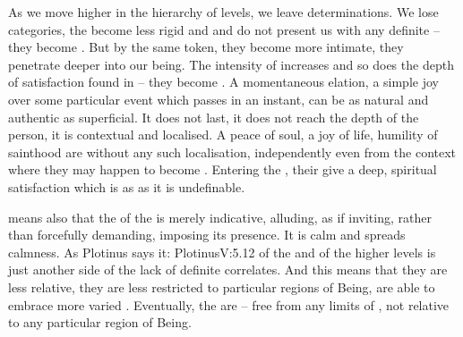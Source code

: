 \pa\label{pa:SchelerA} As we move higher in the hierarchy of levels, we leave
 determinations.  We lose  categories, the
 become less rigid and  and do not present us with
any definite  -- they become .  But by the same token,
they become more intimate, they penetrate deeper into our being.  The intensity
of  increases and so does the depth of satisfaction found in
 -- they become .  A momentaneous elation, a simple joy over some particular
event which passes in an instant, can be as natural and authentic as superficial.
It does not last, it does not reach the depth of the person, it is contextual and
localised.  A peace of soul, a joy of life, humility of sainthood are
 without any such localisation, independently even from the
context where they may happen to become . Entering the \hoa, their
 give a deep, spiritual satisfaction which is as  as it is
undefinable.

 means also that the  of the  is merely
indicative, alluding, as if inviting, rather than forcefully demanding, imposing
its  presence. It is calm and spreads calmness.  As Plotinus says
it: \citet{The Good is gentle and friendly and tender, and we have it present
  when we but will.}{Plotinus}{V:5.12}   of the  and
 of the higher levels is just another side of the lack of
definite  correlates.  And this means that they are less relative,
they are less restricted to particular regions of Being, are able to embrace
more varied .  Eventually, the  are 
-- free from any limits of , not relative to any particular
region of Being.

